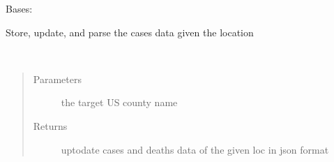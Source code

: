\documentclass[letterpaper,10pt,english]{sphinxmanual}
\begin{document}
\begin{fulllineitems}
\label{\detokenize{Handler:Handler.Manager}}
Bases: 

Store, update, and parse the cases data given the location

\begin{fulllineitems}
\label{\detokenize{Handler:Handler.Manager.data}}
\end{fulllineitems}


\begin{fulllineitems}
\label{\detokenize{Handler:Handler.Manager.filename}}
\end{fulllineitems}


\begin{fulllineitems}
\label{\detokenize{Handler:Handler.Manager.get_data}}~\begin{quote}\begin{description}
\item[{Parameters}] \leavevmode
{} \textendash{} the target US county name

\item[{Returns}] \leavevmode
up\sphinxhyphen{}to\sphinxhyphen{}date cases and deaths data of the given loc in json format

\end{description}\end{quote}

\end{fulllineitems}



\end{fulllineitems}
\end{document}
